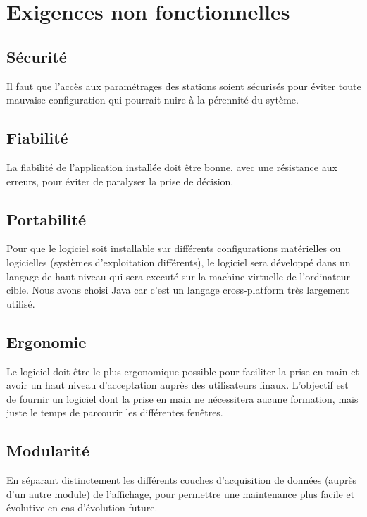 
\section{Exigences non fonctionnelles}

\subsection{Sécurité}
Il faut que l'accès aux paramétrages des stations soient sécurisés pour éviter toute mauvaise configuration qui pourrait nuire à la pérennité du sytème.

\subsection{Fiabilité}
La fiabilité de l'application installée doit être bonne, avec une résistance aux erreurs, pour éviter de paralyser la prise de décision.

\subsection{Portabilité}
Pour que le logiciel soit installable sur différents configurations matérielles ou logicielles (systèmes d'exploitation différents), le logiciel sera développé dans un langage de haut niveau qui sera executé sur la machine virtuelle de l'ordinateur cible. Nous avons choisi Java car c'est un langage cross-platform très largement utilisé.

\subsection{Ergonomie}
Le logiciel doit être le plus ergonomique possible pour faciliter la prise en main et avoir un haut niveau d'acceptation auprès des utilisateurs finaux. L'objectif est de fournir un logiciel dont la prise en main ne nécessitera aucune formation, mais juste le temps de parcourir les différentes fenêtres.

\subsection{Modularité}
En séparant distinctement les différents couches d'acquisition de données (auprès d'un autre module) de l'affichage, pour permettre une maintenance plus facile et évolutive en cas d'évolution future.

